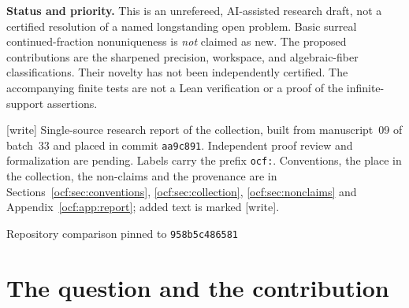 \documentclass[11pt,a4paper]{article}
\numberwithin{equation}{section}
\theoremstyle{definition}
\theoremstyle{remark}
\newcommand{\wtag}{\textup{[write]}}%
\begin{document}
\begin{titlepage}
\begin{minipage}{0.93\textwidth}
\begin{abstract}
Every admissible sequence in a full real-coefficient Hahn field has a
realization in that same field; it has exactly one precisely when the
cumulative denominator degrees are cofinal in the value group. We classify
when the precision ideal is prime and give an exact two-condition criterion
for the fiber to contain at most one element algebraic over its digit field.
For eventually periodic codes an algebraic realization always exists, so
this becomes a sharp one-versus-countably-many dichotomy. Each full surreal
fiber nevertheless contains algebraically independent families of every
set cardinality over every prescribed set-sized coefficient field.
Coordinatewise surcomplex fibers and their changes under fractional linear
maps complete the picture. The proofs are written in full, with finite
symbolic checks and an explicit research agenda.
\end{abstract}
\vspace{3mm}
\begin{statusbox}
\small\textbf{Status and priority.} This is an unrefereed, AI-assisted research
draft, not a certified resolution of a named longstanding open problem.
Basic surreal continued-fraction nonuniqueness is \emph{not} claimed as new.
The proposed contributions are the sharpened precision, workspace, and
algebraic-fiber classifications. Their novelty has not been independently
certified. The accompanying finite tests are not a Lean verification or a
proof of the infinite-support assertions.

\smallskip
\wtag{} Single-source research report of the collection, built from
manuscript~09 of batch~33 and placed in commit \texttt{aa9c891}.
Independent proof review and formalization are pending. Labels carry the
prefix \texttt{ocf:}. Conventions, the place in the collection, the
non-claims and the provenance are in
Sections~\ref{ocf:sec:conventions}, \ref{ocf:sec:collection},
\ref{ocf:sec:nonclaims} and Appendix~\ref{ocf:app:report}; added text is
marked \wtag.
\end{statusbox}
\end{minipage}
\vfill
{\small Repository comparison pinned to \texttt{958b5c486581}\par}
\end{titlepage}
\hypersetup{pageanchor=true}

\begingroup
\small
\setlength{\parskip}{0pt}
\tableofcontents
\endgroup
\newpage
{}

\section{The question and the contribution}
\label{ocf:sec:intro}
\end{document}
